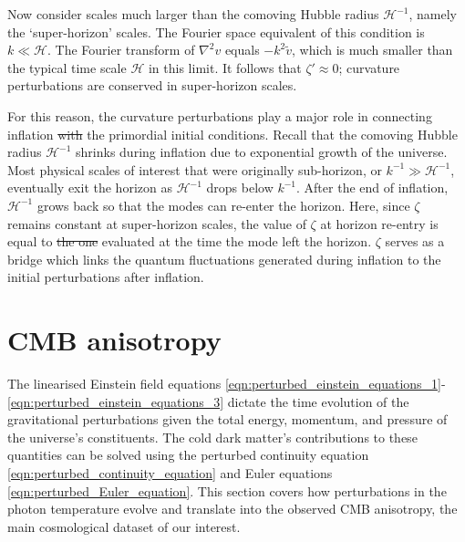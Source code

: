 \documentclass[a4paper,12pt,times,custombib,print,index]{Classes/PhDThesisPSnPDF} %
\providecommand{\DIFadd}[1]{{\protect\color{blue}\uwave{#1}}} %
\providecommand{\DIFdel}[1]{{\protect\color{red}\sout{#1}}}                      %
\providecommand{\DIFaddbegin}{} %
\providecommand{\DIFaddend}{} %
\providecommand{\DIFdelbegin}{} %
\providecommand{\DIFdelend}{} %
\newcommand{\DIFscaledelfig}{0.5}
\newlength{\DIFdelgraphicswidth} %
\newlength{\DIFdelgraphicsheight} %
\newcommand{\DIFaddincludegraphics}[2][]{{\color{blue}\fbox{\DIFOincludegraphics[#1]{#2}}}} %
\newcommand{\DIFdelincludegraphics}[2][]{%
\sbox{\DIFdelgraphicsbox}{\DIFOincludegraphics[#1]{#2}}%
\settoboxwidth{\DIFdelgraphicswidth}{\DIFdelgraphicsbox} %
\settoboxtotalheight{\DIFdelgraphicsheight}{\DIFdelgraphicsbox} %
\scalebox{\DIFscaledelfig}{%
\parbox[b]{\DIFdelgraphicswidth}{\usebox{\DIFdelgraphicsbox}\\[-\baselineskip] \rule{\DIFdelgraphicswidth}{0em}}\llap{\resizebox{\DIFdelgraphicswidth}{\DIFdelgraphicsheight}{%
\setlength{\unitlength}{\DIFdelgraphicswidth}%
\begin{picture}(1,1)%
\thicklines\linethickness{2pt} %
{\color[rgb]{1,0,0}\put(0,0){\framebox(1,1){}}}%
{\color[rgb]{1,0,0}\put(0,0){\line( 1,1){1}}}%
{\color[rgb]{1,0,0}\put(0,1){\line(1,-1){1}}}%
\end{picture}%
}\hspace*{3pt}}} %
} %
\DeclareRobustCommand{\DIFaddbegin}{\DIFOaddbegin \let\includegraphics\DIFaddincludegraphics} %
\DeclareRobustCommand{\DIFaddend}{\DIFOaddend \let\includegraphics\DIFOincludegraphics} %
\DeclareRobustCommand{\DIFdelbegin}{\DIFOdelbegin \let\includegraphics\DIFdelincludegraphics} %
\DeclareRobustCommand{\DIFdelend}{\DIFOaddend \let\includegraphics\DIFOincludegraphics} %
\begin{document}
Now consider scales much larger than the comoving Hubble radius $\mathcal{H}^{-1}$, namely the `super-horizon' scales. The Fourier space equivalent of this condition is $k \ll \mathcal{H}$. The Fourier transform of $\nabla^2 v$ equals $-k^2 \tilde{v}$, which is much smaller than the typical time scale $\mathcal{H}$ in this limit. It follows that $\zeta'\approx 0$; curvature perturbations are conserved in super-horizon scales.

For this reason, the curvature perturbations play a major role in connecting inflation \DIFdelbegin \DIFdel{with }\DIFdelend \DIFaddbegin \DIFadd{to }\DIFaddend the primordial initial conditions. Recall that the comoving Hubble radius $\mathcal{H}^{-1}$ shrinks during inflation due to exponential growth of the universe. Most physical scales of interest that were originally sub-horizon, or $k^{-1}\gg \mathcal{H}^{-1}$, eventually exit the horizon as $\mathcal{H}^{-1}$ drops below $k^{-1}$. After the end of inflation, $\mathcal{H}^{-1}$ grows back so that the modes can re-enter the horizon. Here, since $\zeta$ remains constant at super-horizon scales, the value of $\zeta$ at horizon re-entry is equal to \DIFdelbegin \DIFdel{the one }\DIFdelend \DIFaddbegin \DIFadd{that }\DIFaddend evaluated at the time the mode left the horizon. $\zeta$ serves as a bridge which links the quantum fluctuations generated during inflation to the initial perturbations after inflation.


\section{CMB anisotropy} \label{section:CMB_anisotropy}

The linearised Einstein field equations \eqref{eqn:perturbed_einstein_equations_1}-\eqref{eqn:perturbed_einstein_equations_3} dictate the time evolution of the gravitational perturbations given the total energy, momentum, and pressure of the universe's constituents. The cold dark matter's contributions to these quantities can be solved using the perturbed continuity equation \eqref{eqn:perturbed_continuity_equation} and Euler equations \eqref{eqn:perturbed_Euler_equation}. This section covers how perturbations in the photon temperature evolve and translate into the observed CMB anisotropy, the main cosmological dataset of our interest.
\end{document}
